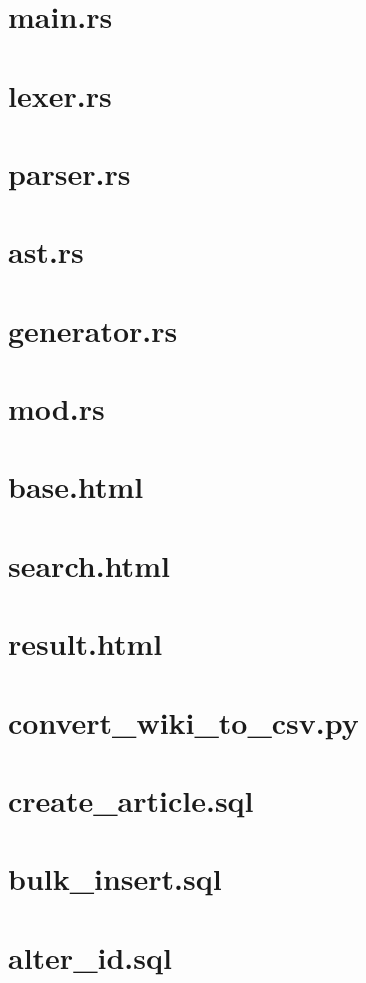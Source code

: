 \section{main.rs}

\section{lexer.rs}

\section{parser.rs}

\section{ast.rs}

\section{generator.rs}

\section{mod.rs}

\section{base.html}

\section{search.html}

\section{result.html}

\section{convert\_wiki\_to\_csv.py}

\section{create\_article.sql}

\section{bulk\_insert.sql}

\section{alter\_id.sql}

